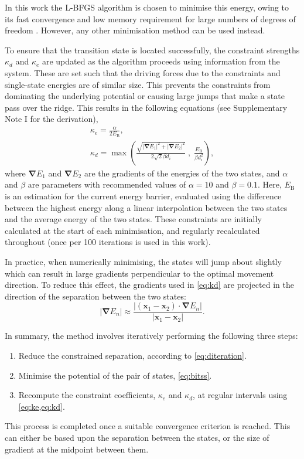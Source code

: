 \documentclass[aip,jcp,reprint,twocolumn]{revtex4-1}
\newcommand{\abs}[1]{\left| #1 \right|}
\newcommand{\grad}{\bm{\nabla}}
\begin{document}
In this work the L-BFGS algorithm is chosen to minimise this energy, owing to its fast convergence and low memory requirement for large numbers of degrees of freedom \cite{Liu1989}.
However, any other minimisation method can be used instead.

To ensure that the transition state is located successfully, the constraint strengths $\kappa_d$ and $\kappa_e$ are updated as the algorithm proceeds using information from the system.
These are set such that the driving forces due to the constraints and single-state energies are of similar size.
This prevents the constraints from dominating the underlying potential or causing large jumps that make a state pass over the ridge.
This results in the following equations (see Supplementary Note I for the derivation),
\begin{gather}
  \kappa_e = \frac {\alpha} {2 E_\mathrm{B}},
  \label{eq:ke}
  \\
  \kappa_d = \max \left(
    \frac {\sqrt{\abs{\grad E_1}^2 + \abs{\grad E_2}^2}} {2\sqrt{2} \beta d_i} \; , \;
    \frac{E_\mathrm{B}}{\beta d_i^2} \right),
  \label{eq:kd}
\end{gather}
where $\grad E_1$ and $\grad E_2$ are the gradients of the energies of the two states, and $\alpha$ and $\beta$ are parameters with recommended values of $\alpha = 10$ and $\beta = 0.1$.
Here, $E_\mathrm{B}$ is an estimation for the current energy barrier, evaluated using the difference between the highest energy along a linear interpolation between the two states and the average energy of the two states.
These constraints are initially calculated at the start of each minimisation, and regularly recalculated throughout (once per 100 iterations is used in this work).

In practice, when numerically minimising, the states will jump about slightly which can result in large gradients perpendicular to the optimal movement direction.
To reduce this effect, the gradients used in \cref{eq:kd} are projected in the direction of the separation between the two states:
\begin{equation}
  \abs{\grad E_n} \approx \frac {\abs{(\bm{x}_1 - \bm{x}_2) \cdot \grad E_n}} {\abs{\bm{x}_1 - \bm{x}_2}}.
\end{equation}

In summary, the method involves iteratively performing the following three steps:
\begin{enumerate}
  \item Reduce the constrained separation, according to \cref{eq:diteration}.
  \item Minimise the potential of the pair of states, \cref{eq:bitss}.
  \item Recompute the constraint coefficients, $\kappa_e$ and $\kappa_d$, at regular intervals using \cref{eq:ke,eq:kd}.
\end{enumerate}
This process is completed once a suitable convergence criterion is reached.
This can either be based upon the separation between the states, or the size of gradient at the midpoint between them.
\end{document}
